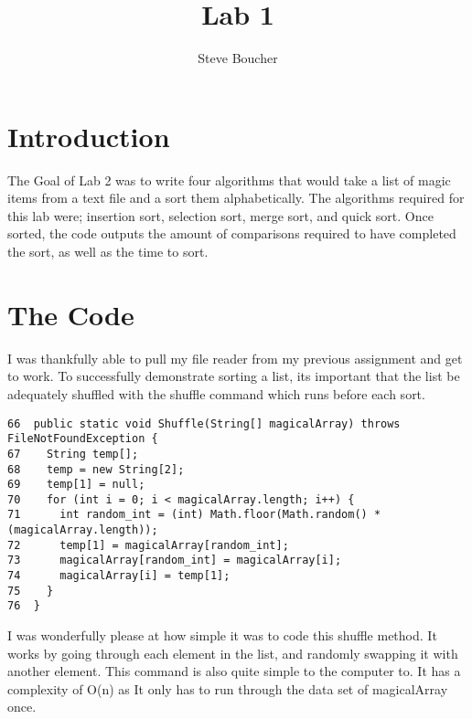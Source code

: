 \documentclass{article}
\title{Lab 1}
\author{Steve Boucher}
\begin{document}



\section{Introduction}
The Goal of Lab 2 was to write four algorithms that would take a list of magic items from a text file and a sort them alphabetically. The algorithms required for this lab were; insertion sort, selection sort, merge sort, and quick sort. Once sorted, the code outputs the amount of comparisons required to have completed the sort, as well as the time to sort.

\section{The Code}
I was thankfully able to pull my file reader from my previous assignment and get to work. To successfully demonstrate sorting a list, its important that the list be adequately shuffled with the shuffle command which runs before each sort. 
\begin{verbatim}
66  public static void Shuffle(String[] magicalArray) throws FileNotFoundException {
67    String temp[];
68    temp = new String[2];
69    temp[1] = null;
70    for (int i = 0; i < magicalArray.length; i++) {
71      int random_int = (int) Math.floor(Math.random() * (magicalArray.length));
72      temp[1] = magicalArray[random_int];
73      magicalArray[random_int] = magicalArray[i];
74      magicalArray[i] = temp[1];
75    }
76  }
\end{verbatim}
  I was wonderfully please at how simple it was to code this shuffle method. It works by going through each element in the list, and randomly swapping it with another element. This command is also quite simple to the computer to. It has a complexity of O(n) as It only has to run through the data set of magicalArray once.
\end{document}
